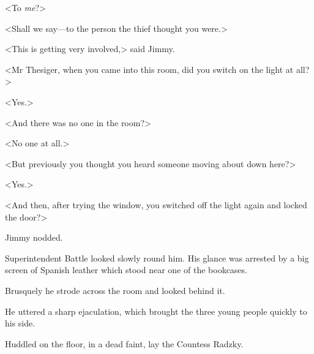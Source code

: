 <To \emph{me}?>

<Shall we say—to the person the thief thought you were.>

<This is getting very involved,> said Jimmy.

<Mr Thesiger, when you came into this room, did you switch on the light at all?>

<Yes.>

<And there was no one in the room?>

<No one at all.>

<But previously you thought you heard someone moving about down here?>

<Yes.>

<And then, after trying the window, you switched off the light again and locked the door?>

Jimmy nodded.

Superintendent Battle looked slowly round him. His glance was arrested by a big screen of Spanish leather which stood near one of the bookcases.

Brusquely he strode across the room and looked behind it.

He uttered a sharp ejaculation, which brought the three young people quickly to his side.

Huddled on the floor, in a dead faint, lay the Countess Radzky.